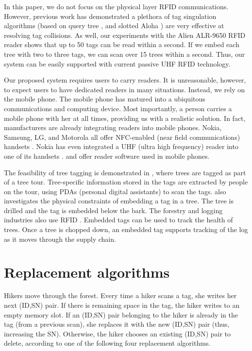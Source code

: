 \documentclass[conference]{IEEEtran}
\begin{document}
In this paper, we do not focus on the physical layer RFID communications.  However, previous work has demonstrated a plethora of tag singulation algorithms (based on query tree \cite{conf:Law01}, and slotted Aloha \cite{conf:Vogt01} ) are very effective at resolving tag collisions.    As well, our experiments with the Alien ALR-9650 RFID reader \cite{web:alien} shows that up to 50 tags can be read within a second.  If we embed each tree with two to three tags, we can scan over 15 trees within a second.  Thus, our system can be easily supported with current passive UHF RFID technology.

Our proposed system requires users to carry readers.  It is unreasonable, however, to expect users to have dedicated readers in many situations.  Instead, we rely on the mobile phone.  The mobile phone has matured into a ubiquitous communications and computing device.  Most importantly, a person carries a mobile phone with her at all times, providing us with a realistic solution.  In fact, manufacturers are already integrating readers into mobile phones.  Nokia, Samsung, LG, and Motorola all offer NFC-enabled (near field communications) handsets \cite{web:nfc01}.  Nokia has even integrated a UHF (ultra high frequency) reader into one of its handsets \cite{conf:Savolainen01}.  \cite{conf:Loffler01} and \cite{conf:Pohjanheimo01} offer reader software used in mobile phones.

The feasibility of tree tagging is demonstrated in \cite{conf:Hoyt01}, where trees are tagged as part of a tree tour.  Tree-specific information stored in the tags are extracted by people on the tour, using PDAs (personal digital assistants) to scan the tags.  \cite{conf:Hoyt01} also investigates the physical constraints of embedding a tag in a tree.  The tree is drilled and the tag is embedded below the bark.  The forestry and logging industries also use RFID \cite{web:discover01}.  Embedded tags can be used to track the health of trees.  Once a tree is chopped down, an embedded tag supports tracking of the log as it moves through the supply chain.

\section{Replacement algorithms}
\label{sec:algorithms}
Hikers move through the forest.  Every time a hiker scans a tag, she writes her next (ID,SN) pair.  If there is remaining space in the tag, the hiker writes to an empty memory slot.  If an (ID,SN) pair belonging to the hiker is already in the tag (from a previous scan), she replaces it with the new (ID,SN) pair (thus, increasing the SN).  Otherwise, the hiker chooses an existing (ID,SN) pair to delete, according to one of the following four replacement algorithms.
\end{document}

